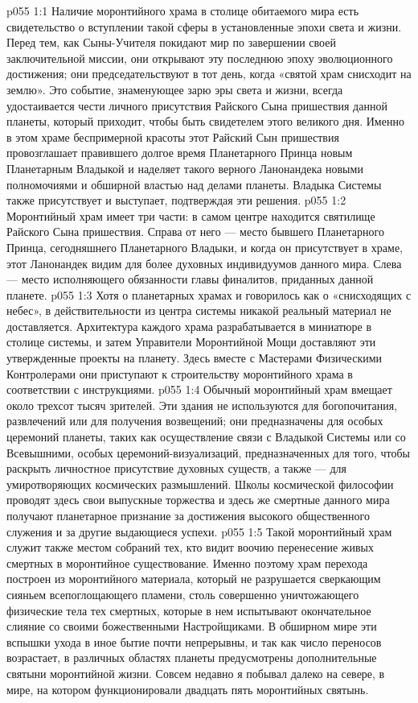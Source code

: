 \vs p055 1:1 Наличие моронтийного храма в столице обитаемого мира есть свидетельство о вступлении такой сферы в установленные эпохи света и жизни. Перед тем, как Сыны\hyp{}Учителя покидают мир по завершении своей заключительной миссии, они открывают эту последнюю эпоху эволюционного достижения; они председательствуют в тот день, когда «святой храм снисходит на землю». Это событие, знаменующее зарю эры света и жизни, всегда удостаивается чести личного присутствия Райского Сына пришествия данной планеты, который приходит, чтобы быть свидетелем этого великого дня. Именно в этом храме беспримерной красоты этот Райский Сын пришествия провозглашает правившего долгое время Планетарного Принца новым Планетарным Владыкой и наделяет такого верного Ланонандека новыми полномочиями и обширной властью над делами планеты. Владыка Системы также присутствует и выступает, подтверждая эти решения.
\vs p055 1:2 Моронтийный храм имеет три части: в самом центре находится святилище Райского Сына пришествия. Справа от него --- место бывшего Планетарного Принца, сегодняшнего Планетарного Владыки, и когда он присутствует в храме, этот Ланонандек видим для более духовных индивидуумов данного мира. Слева --- место исполняющего обязанности главы финалитов, приданных данной планете.
\vs p055 1:3 \pc Хотя о планетарных храмах и говорилось как о «снисходящих с небес», в действительности из центра системы никакой реальный материал не доставляется. Архитектура каждого храма разрабатывается в миниатюре в столице системы, и затем Управители Моронтийной Мощи доставляют эти утвержденные проекты на планету. Здесь вместе с Мастерами Физическими Контролерами они приступают к строительству моронтийного храма в соответствии с инструкциями.
\vs p055 1:4 \pc Обычный моронтийный храм вмещает около трехсот тысяч зрителей. Эти здания не используются для богопочитания, развлечений или для получения возвещений; они предназначены для особых церемоний планеты, таких как осуществление связи с Владыкой Системы или со Всевышними, особых церемоний\hyp{}визуализаций, предназначенных для того, чтобы раскрыть личностное присутствие духовных существ, а также --- для умиротворяющих космических размышлений. Школы космической философии проводят здесь свои выпускные торжества и здесь же смертные данного мира получают планетарное признание за достижения высокого общественного служения и за другие выдающиеся успехи.
\vs p055 1:5 Такой моронтийный храм служит также местом собраний тех, кто видит воочию перенесение живых смертных в моронтийное существование. Именно поэтому храм перехода построен из моронтийного материала, который не разрушается сверкающим сияньем всепоглощающего пламени, столь совершенно уничтожающего физические тела тех смертных, которые в нем испытывают окончательное слияние со своими божественными Настройщиками. В обширном мире эти вспышки ухода в иное бытие почти непрерывны, и так как число переносов возрастает, в различных областях планеты предусмотрены дополнительные святыни моронтийной жизни. Совсем недавно я побывал далеко на севере, в мире, на котором функционировали двадцать пять моронтийных святынь.
